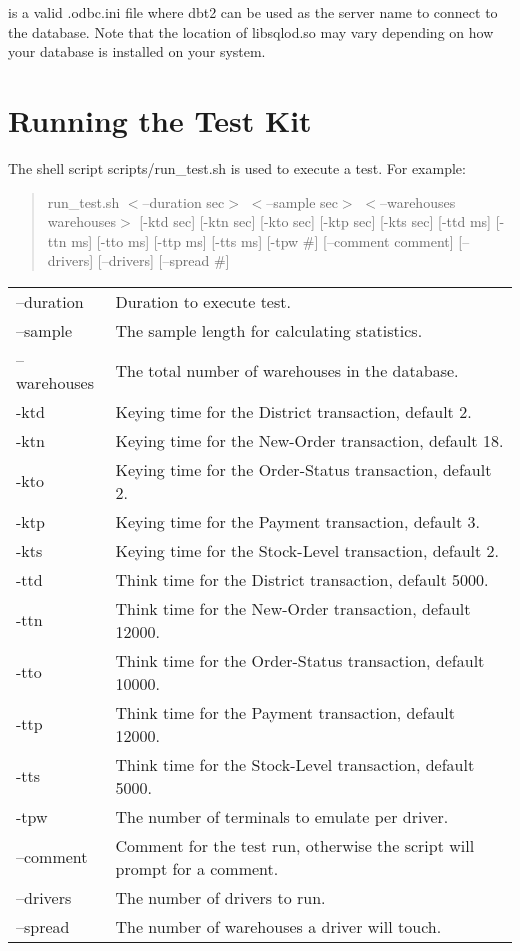 \documentclass{article}
\begin{document}
\noindent
is a valid .odbc.ini file where dbt2 can be used as the server name to
connect to the database.  Note that the location of libsqlod.so may vary
depending on how your database is installed on your system.

\section{Running the Test Kit}

\noindent
The shell script scripts/run\_test.sh is used to execute a test.  For
example:
\begin{verse}
run\_test.sh $<$--duration sec$>$ $<$--sample sec$>$ $<$--warehouses warehouses$>$ [-ktd sec] [-ktn sec] [-kto sec] [-ktp sec] [-kts sec] [-ttd ms] [-ttn ms] [-tto ms] [-ttp ms] [-tts ms] [-tpw \#] [--comment comment] [--drivers] [--drivers] [--spread \#]
\end{verse}

\begin{tabular}[c]{ll}
--duration	&	Duration to execute test. \\
--sample	&	The sample length for calculating statistics. \\
--warehouses	&	The total number of warehouses in the database. \\
-ktd		&	Keying time for the District transaction, default 2. \\
-ktn		&	Keying time for the New-Order transaction, default
			18. \\
-kto		&	Keying time for the Order-Status transaction, default
			2. \\
-ktp		&	Keying time for the Payment transaction, default 3. \\
-kts		&	Keying time for the Stock-Level transaction, default
			2. \\
-ttd		&	Think time for the District transaction, default
			5000. \\
-ttn		&	Think time for the New-Order transaction, default
			12000. \\
-tto		&	Think time for the Order-Status transaction, default
			10000. \\
-ttp		&	Think time for the Payment transaction, default
			12000. \\
-tts		&	Think time for the Stock-Level transaction, default
			5000. \\
-tpw		&	The number of terminals to emulate per driver. \\
--comment	&	Comment for the test run, otherwise the script will
			prompt for a comment. \\
--drivers	&	The number of drivers to run. \\
--spread	&	The number of warehouses a driver will touch. \\
\end{tabular}
\end{document}
